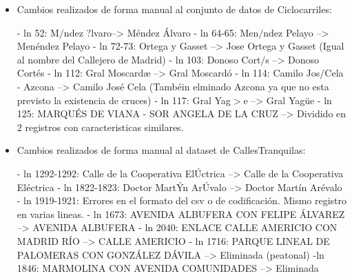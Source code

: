 \begin{itemize}

\item Cambios realizados de forma manual al conjunto de datos de Ciclocarriles:
\begin{tiny}
\newline - ln 52: M$/$ndez ?lvaro--> Méndez Álvaro
\newline - ln 64-65: Men$/$ndez Pelayo --> Menéndez Pelayo
\newline - ln 72-73: Ortega y Gasset --> Jose Ortega y Gasset (Igual al nombre del Callejero de Madrid)
\newline - ln 103: Donoso Cort$/$s --> Donoso Cortés
\newline - ln 112: Gral Moscardæ --> Gral Moscardó
\newline - ln 114: Camilo Jos$/$Cela - Azcona --> Camilo José Cela (Tambéin elminado Azcona ya que no esta previsto la existencia de cruces)
\newline - ln 117: Gral Yag$>$e --> Gral Yagüe
\newline - ln 125: MARQUÉS DE VIANA - SOR ANGELA DE LA CRUZ --> Dividido en 2 registros con caracteristicas similares.
\newline
\end{tiny}


	\item Cambios realizados de forma manual al dataset de CallesTranquilas:
\begin{tiny}
\newline - ln 1292-1292: Calle de la Cooperativa ElÚctrica --> Calle de la Cooperativa Eléctrica
\newline - ln 1822-1823: Doctor MartÝn ArÚvalo --> Doctor Martín Arévalo
\newline - ln 1919-1921: Errores en el formato del csv o de codificación. Mismo registro en varias lineas.
\newline 	- ln 1673: AVENIDA ALBUFERA CON FELIPE ÁLVAREZ --> AVENIDA ALBUFERA
\newline - ln 2040: ENLACE CALLE AMERICIO CON MADRID RÍO --> CALLE AMERICIO
- ln 1716: PARQUE LINEAL DE PALOMERAS CON GONZÁLEZ DÁVILA --> Eliminada (peatonal)
-ln 1846: MARMOLINA CON AVENIDA COMUNIDADES --> Eliminada
\end{tiny}



\end{itemize}
